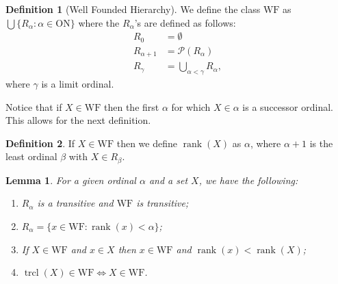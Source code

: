 \documentclass{report}
\newtheorem{lemma}{Lemma}[section]
\theoremstyle{definition}
\newtheorem{definition}{Definition}[section]
\theoremstyle{remark}
\newcommand{\set}[1]{\{#1\}}
\newcommand{\powerset}[1]{\mathcal{P}\left (#1\right)}
\newcommand{\ON}{\mathrm{ON}}
\newcommand{\WF}{\mathrm{WF}}
\DeclareMathOperator{\rank}{rank}
\DeclareMathOperator{\trcl}{trcl}
\begin{document}
    \begin{definition}[Well Founded Hierarchy]
        We define the class $\mathrm{WF}$ as $\bigcup \set{R_\alpha : \alpha \in \ON}$ where the $R_\alpha$'s are defined as follows:
        \begin{align*}
            R_0 &= \emptyset \\
            R_{\alpha+1} &= \powerset{R_\alpha} \\
            R_{\gamma} &= \bigcup_{\alpha < \gamma} R_\alpha,
        \end{align*} where $\gamma$ is a limit ordinal.
    \end{definition}
    
    Notice that if $X \in \mathrm{WF}$ then the first $\alpha$ for which $X \in \alpha$ is a successor ordinal. This allows for the next definition.
    
    \begin{definition}
        If $X \in \WF$ then we define $\rank(X)$ as $\alpha$, where $\alpha + 1$ is the least ordinal $\beta$ with $X \in R_{\beta}$.
    \end{definition}
    
    \begin{lemma} \label{lem:R_facts}
    For a given ordinal $\alpha$ and a set $X$, we have the following:
        \begin{enumerate}
            \item $R_\alpha$ is a transitive and $\WF$ is transitive;
            \item $R_\alpha = \set{x \in \WF : \rank(x) < \alpha}$;
            \item If $X \in \WF$ and $x \in X$ then $x \in \WF$ and $\rank(x) < \rank(X)$;
            \item $\trcl(X) \in \WF \iff X \in \WF$.
        \end{enumerate}
    \end{lemma}
    
\end{document}
